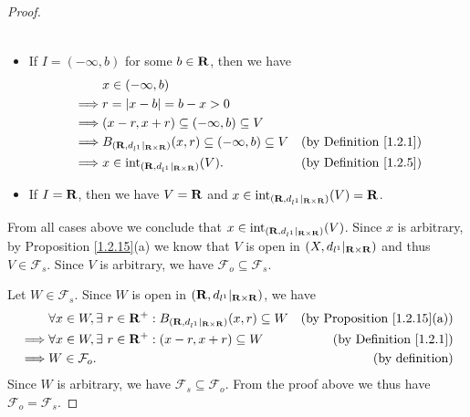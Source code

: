 \begin{proof}
\begin{itemize}
\begin{align*}
              \end{align*}
        \item If \(I = (-\infty, b)\) for some \(b \in \mathbf{R}\), then we have
              \begin{align*}
                           & x \in (-\infty, b)                                                                                              \\
                  \implies & r = \left\lvert x - b\right\rvert = b - x > 0                                                                                     \\
                  \implies & (x - r, x + r) \subseteq (-\infty, b) \subseteq V                                                               \\
                  \implies & B_{(\mathbf{R}, d_{l^1}|_{\mathbf{R} \times \mathbf{R}})}(x, r) \subseteq (-\infty, b) \subseteq V & \text{(by Definition \ref{1.2.1})} \\
                  \implies & x \in \text{int}_{(\mathbf{R}, d_{l^1}|_{\mathbf{R} \times \mathbf{R}})}(V).                       & \text{(by Definition \ref{1.2.5})}
              \end{align*}
        \item If \(I = \mathbf{R}\), then we have \(V = \mathbf{R}\) and \(x \in \text{int}_{(\mathbf{R}, d_{l^1}|_{\mathbf{R} \times \mathbf{R}})}(V) = \mathbf{R}\).
    \end{itemize}
    From all cases above we conclude that \(x \in \text{int}_{(\mathbf{R}, d_{l^1}|_{\mathbf{R} \times \mathbf{R}})}(V)\).
    Since \(x\) is arbitrary, by Proposition \ref{1.2.15}(a) we know that \(V\) is open in \((X, d_{l^1}|_{\mathbf{R} \times \mathbf{R}})\) and thus \(V \in \mathcal{F}_s\).
    Since \(V\) is arbitrary, we have \(\mathcal{F}_o \subseteq \mathcal{F}_s\).

    Let \(W \in \mathcal{F}_s\).
    Since \(W\) is open in \((\mathbf{R}, d_{l^1}|_{\mathbf{R} \times \mathbf{R}})\), we have
    \begin{align*}
                 & \forall x \in W, \exists\ r \in \mathbf{R}^+ : B_{(\mathbf{R}, d_{l^1}|_{\mathbf{R} \times \mathbf{R}})}(x, r) \subseteq W & \text{(by Proposition \ref{1.2.15}(a))} \\
        \implies & \forall x \in W, \exists\ r \in \mathbf{R}^+ : (x - r, x + r) \subseteq W                          & \text{(by Definition \ref{1.2.1})}      \\
        \implies & W \in \mathcal{F}_o.                                                                       & \text{(by definition)}
    \end{align*}
    Since \(W\) is arbitrary, we have \(\mathcal{F}_s \subseteq \mathcal{F}_o\).
    From the proof above we thus have \(\mathcal{F}_o = \mathcal{F}_s\).


\end{proof}
